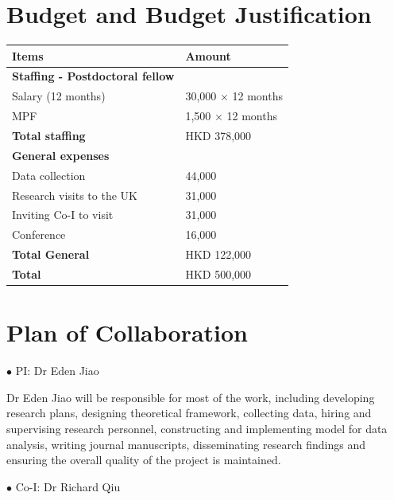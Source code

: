 \documentclass[11pt,a4paper]{amsart}
\theoremstyle{plain}
\theoremstyle{definition}
\begin{document}
\section{Budget and Budget Justification}
\begin{singlespace}
	\begin{table}[H] 
			\begin{center}
				\begin{NiceTabular*}{\linewidth}{@{\extracolsep{\fill}}ll}
				\toprule
				Items & Amount\\
				\midrule
				\textbf{Staffing - Postdoctoral fellow} & \\
				\phantom{ZZ} Salary (12 months) & 30,000 $\times$ 12 months\\
				\phantom{ZZ} MPF & 1,500 $\times$ 12 months\\
				\textbf{Total staffing} & HKD 378,000 \\
				\textbf{General expenses} & \\
				\phantom{ZZ} Data collection & 44,000 \\
				\phantom{ZZ} Research visits to the UK & 31,000 \\
				\phantom{ZZ} Inviting Co-I to visit & 31,000 \\
				\phantom{ZZ} Conference & 16,000 \\
				\textbf{Total General} & HKD 122,000 \\
				\textbf{Total} & HKD 500,000 \\
				\bottomrule
				\end{NiceTabular*}
			\end{center}
	\end{table}
\end{singlespace}
\newpage

\section{Plan of Collaboration}
$\bullet$ PI: Dr Eden Jiao

\noindent Dr Eden Jiao will be responsible for most of the work, including developing research plans, designing theoretical framework, collecting data, hiring and supervising research personnel, constructing and implementing model for data analysis, writing journal manuscripts, disseminating research findings and ensuring the overall quality of the project is maintained. 
\vspace{3pt}

$\bullet$ Co-I: Dr Richard Qiu
\end{document}
